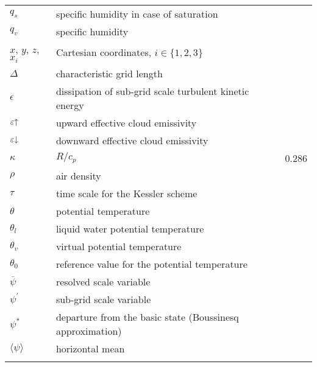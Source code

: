 \documentclass[11pt,a4paper]{scrartcl}
\begin{document}
\begin{longtable}{p{2.5cm} p{9.0cm} p{2.5cm}}
 $q_{s}$ & specific humidity in case of saturation & \\
 $q_{v}$ & specific humidity & \\ 
 $x$, $y$, $z$, $x_{i}$  & Cartesian coordinates, $i\in\{1,2,3\}$ & \\
 $\Delta$ & characteristic grid length & \\
 $\epsilon$ & dissipation of sub-grid scale turbulent kinetic energy & \\
 $\varepsilon\textnormal{\textuparrow}$ & upward effective cloud emissivity  & \\
 $\varepsilon\textnormal{\textdownarrow}$ & downward effective cloud emissivity  & \\
 $\kappa$ &$R/c_{p}$  & 0.286 \\
 $\rho$ & air density  & \\
 $\tau$ & time scale for the Kessler scheme & \\
 $\theta$ & potential temperature & \\
 $\theta_{l}$ & liquid water potential temperature & \\
 $\theta_{v}$ & virtual potential temperature &  \\
 $\theta_{0}$ & reference value for the potential temperature & \\
 $\overline\psi$ & resolved scale variable & \\
 $\psi^{'}$ & sub-grid scale variable & \\
 $\psi^{\ast}$ & departure from the basic state (Boussinesq approximation) &  \\
 $\langle\psi\rangle$ & horizontal mean \\
\addlinespace
\bottomrule
\end{longtable}
\end{document}
